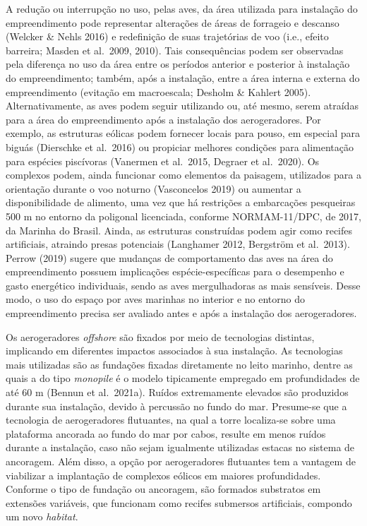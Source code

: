 \documentclass[
  oneside]{scrbook}
\begin{document}
A redução ou interrupção no uso, pelas aves, da área utilizada para instalação do empreendimento pode representar alterações de áreas de forrageio e descanso (Welcker \& Nehls 2016) e redefinição de suas trajetórias de voo (i.e., efeito barreira; Masden et al.~2009, 2010). Tais consequências podem ser observadas pela diferença no uso da área entre os períodos anterior e posterior à instalação do empreendimento; também, após a instalação, entre a área interna e externa do empreendimento (evitação em macroescala; Desholm \& Kahlert 2005). Alternativamente, as aves podem seguir utilizando ou, até mesmo, serem atraídas para a área do empreendimento após a instalação dos aerogeradores. Por exemplo, as estruturas eólicas podem fornecer locais para pouso, em especial para biguás (Dierschke et al.~2016) ou propiciar melhores condições para alimentação para espécies piscívoras (Vanermen et al.~2015, Degraer et al.~2020). Os complexos podem, ainda funcionar como elementos da paisagem, utilizados para a orientação durante o voo noturno (Vasconcelos 2019) ou aumentar a disponibilidade de alimento, uma vez que há restrições a embarcações pesqueiras 500 m no entorno da poligonal licenciada, conforme NORMAM-11/DPC, de 2017, da Marinha do Brasil. Ainda, as estruturas construídas podem agir como recifes artificiais, atraindo presas potenciais (Langhamer 2012, Bergström et al.~2013). Perrow (2019) sugere que mudanças de comportamento das aves na área do empreendimento possuem implicações espécie-específicas para o desempenho e gasto energético individuais, sendo as aves mergulhadoras as mais sensíveis. Desse modo, o uso do espaço por aves marinhas no interior e no entorno do empreendimento precisa ser avaliado antes e após a instalação dos aerogeradores.

Os aerogeradores \emph{offshore} são fixados por meio de tecnologias distintas, implicando em diferentes impactos associados à sua instalação. As tecnologias mais utilizadas são as fundações fixadas diretamente no leito marinho, dentre as quais a do tipo \emph{monopile} é o modelo tipicamente empregado em profundidades de até 60 m (Bennun et al.~2021a). Ruídos extremamente elevados são produzidos durante sua instalação, devido à percussão no fundo do mar. Presume-se que a tecnologia de aerogeradores flutuantes, na qual a torre localiza-se sobre uma plataforma ancorada ao fundo do mar por cabos, resulte em menos ruídos durante a instalação, caso não sejam igualmente utilizadas estacas no sistema de ancoragem. Além disso, a opção por aerogeradores flutuantes tem a vantagem de viabilizar a implantação de complexos eólicos em maiores profundidades. Conforme o tipo de fundação ou ancoragem, são formados substratos em extensões variáveis, que funcionam como recifes submersos artificiais, compondo um novo \emph{habitat}.
\end{document}
